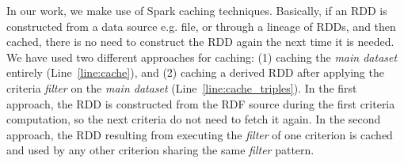 In our work, we make use of Spark caching techniques. 
Basically, if an \gls{RDD} is constructed from a data source e.g. file, or through a lineage of
\gls{RDD}s, and then cached, there is no need to construct the \gls{RDD} again the next time it is needed.
We have used two different approaches for caching: (1) caching the \emph{main dataset} entirely (Line~\ref{line:cache}), and (2) caching a derived \gls{RDD} after applying the criteria \emph{filter} on the \emph{main dataset} (Line~\ref{line:cache_triples}). 
In the first approach, the \gls{RDD} is constructed from the \gls{RDF} source during the first criteria computation, so the next criteria do not need to fetch it again. 
In the second approach, the \gls{RDD} resulting from executing the \emph{filter} of one criterion is cached and used by any other criterion sharing the same \textit{filter} pattern. 

